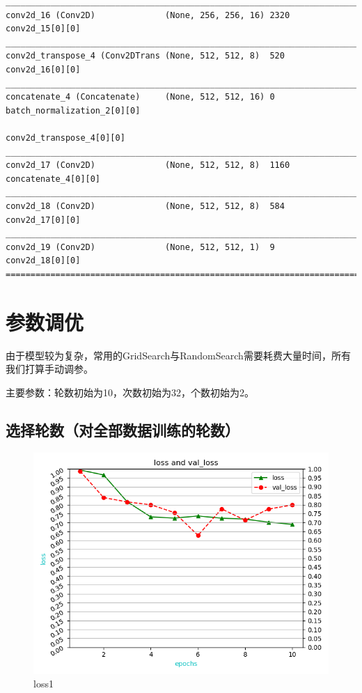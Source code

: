 \begin{lstlisting}[basicstyle=\tiny]
__________________________________________________________________________________________________
conv2d_16 (Conv2D)              (None, 256, 256, 16) 2320        conv2d_15[0][0]                  
__________________________________________________________________________________________________
conv2d_transpose_4 (Conv2DTrans (None, 512, 512, 8)  520         conv2d_16[0][0]                  
__________________________________________________________________________________________________
concatenate_4 (Concatenate)     (None, 512, 512, 16) 0           batch_normalization_2[0][0]      
                                                                 conv2d_transpose_4[0][0]         
__________________________________________________________________________________________________
conv2d_17 (Conv2D)              (None, 512, 512, 8)  1160        concatenate_4[0][0]              
__________________________________________________________________________________________________
conv2d_18 (Conv2D)              (None, 512, 512, 8)  584         conv2d_17[0][0]                  
__________________________________________________________________________________________________
conv2d_19 (Conv2D)              (None, 512, 512, 1)  9           conv2d_18[0][0]                  
==================================================================================================
\end{lstlisting}

\section{参数调优}

由于模型较为复杂，常用的GridSearch与RandomSearch需要耗费大量时间，所有我们打算手动调参。

主要参数：轮数初始为10，次数初始为32，个数初始为2。

\subsection{选择轮数（对全部数据训练的轮数）}

\begin{figure}[htbp]
\centering
\includegraphics[width=0.8\linewidth]{body/model_pic/loss1}
\caption{loss1}
\label{fig::model17}
\end{figure}

